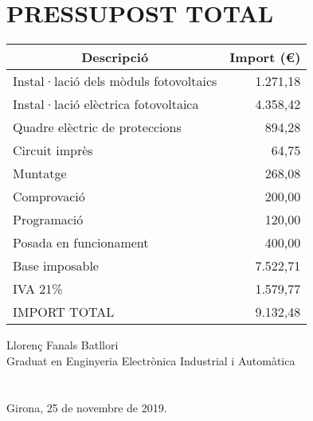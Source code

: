 \chapter{\uppercase{Pressupost total}}



\begin{table}[H]
  \centering
    \begin{tabularx} {\textwidth} {|X|r|} \hline
  \multicolumn{1}{|c|}{Descripció} &  \multicolumn{1}{c|}{Import (€)}\\ \hline \hline
Instal·lació dels mòduls fotovoltaics & 1.271,18 \\ \hline
Instal·lació elèctrica fotovoltaica & 4.358,42 \\ \hline
Quadre elèctric de proteccions & 894,28 \\ \hline
Circuit imprès & 64,75 \\ \hline
Muntatge & 268,08 \\ \hline
Comprovació & 200,00 \\ \hline
Programació & 120,00 \\ \hline
Posada en funcionament & 400,00 \\ \hline
\hline
Base imposable & 7.522,71 \\ \hline
IVA 21\% & 1.579,77 \\ \hline 
\hline
IMPORT TOTAL & 9.132,48 \\ \hline
    \end{tabularx}%
  \label{tab:addlabel}%
\end{table}%


\vspace*{\fill}
\noindent Llorenç Fanals Batllori\\
Graduat en Enginyeria Electrònica Industrial i Automàtica\\
\\
\\
Girona, 25 de novembre de 2019.

\clearpage